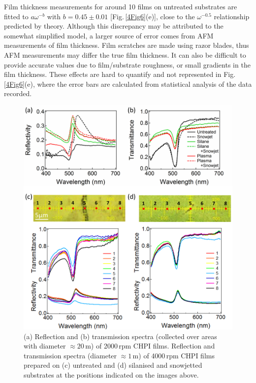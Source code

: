 Film thickness measurements for around 10 films on untreated substrates are fitted to $a\omega^{-b}$ with $b=0.45\pm0.01$ [Fig.\,\ref{4Fig6}(e)], close to the $\omega^{-0.5}$ relationship predicted by theory. Although this discrepancy may be attributed to the somewhat simplified model, a larger source of error comes from AFM measurements of film thickness. Film scratches are made using razor blades, thus AFM measurements may differ the true film thickness. It can also be difficult to provide accurate values due to film/substrate roughness, or small gradients in the film thickness. These effects are hard to quantify and not represented in Fig.\,\ref{4Fig6}(e), where the error bars are calculated from statistical analysis of the data recorded.

\begin{figure}[] 
\centering    
\includegraphics[width=\textwidth]{Fig7}
\caption{(a) Reflection and (b) transmission spectra (collected over areas with diameter $\approx 20\,$\textmu m) of 2000\,rpm CHPI films. Reflection and transmission spectra (diameter $\approx1\,$\textmu m) of 4000\,rpm CHPI films prepared on (c) untreated and (d) silanised and snowjetted substrates at the positions indicated on the images above.}
\label{4Fig7}
\end{figure}

